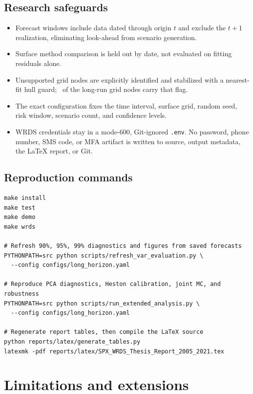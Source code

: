 \documentclass[11pt,a4paper]{article}
\newcommand{\code}[1]{\texttt{#1}}
\begin{document}
\subsection{Research safeguards}

\begin{itemize}
  \item Forecast windows include data dated through origin $t$ and exclude the $t+1$ realization,
  eliminating look-ahead from scenario generation.
  \item Surface method comparison is held out by date, not evaluated on fitting residuals alone.
  \item Unsupported grid nodes are explicitly identified and stabilized with a nearest-fit hull
  guard; \ExtrapolatedShare\ of the long-run grid nodes carry that flag.
  \item The exact configuration fixes the time interval, surface grid, random seed, risk window,
  scenario count, and confidence levels.
  \item WRDS credentials stay in a mode-600, Git-ignored \code{.env}. No password, phone number,
  SMS code, or MFA artifact is written to source, output metadata, the LaTeX report, or Git.
\end{itemize}

\subsection{Reproduction commands}

\begin{verbatim}
make install
make test
make demo
make wrds

# Refresh 90%, 95%, 99% diagnostics and figures from saved forecasts
PYTHONPATH=src python scripts/refresh_var_evaluation.py \
  --config configs/long_horizon.yaml

# Reproduce PCA diagnostics, Heston calibration, joint MC, and robustness
PYTHONPATH=src python scripts/run_extended_analysis.py \
  --config configs/long_horizon.yaml

# Regenerate report tables, then compile the LaTeX source
python reports/latex/generate_tables.py
latexmk -pdf reports/latex/SPX_WRDS_Thesis_Report_2005_2021.tex
\end{verbatim}

\section{Limitations and extensions}
\end{document}
